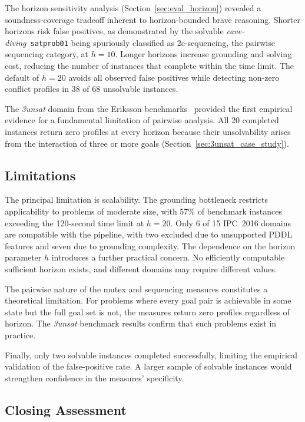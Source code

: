 The horizon sensitivity analysis (Section~\ref{sec:eval_horizon}) revealed a soundness-coverage \linebreak tradeoff inherent to horizon-bounded brave reasoning. Shorter horizons risk false positives, as demonstrated by the solvable \textit{cave-diving}~\texttt{satprob01} being spuriously classified as 2c-sequencing, the pairwise sequencing category, at $h = 10$. Longer horizons increase grounding and solving cost, reducing the number of instances that complete within the time limit. The default of $h = 20$ avoids all observed false positives while detecting non-zero conflict profiles in 38 of 68 unsolvable instances.

The \textit{3unsat} domain from the Eriksson benchmarks~\cite{Eriksson2019} provided the first empirical evidence for a fundamental limitation of pairwise analysis. All 20 completed instances return zero profiles at every horizon because their unsolvability arises from the interaction of three or more goals (Section~\ref{sec:3unsat_case_study}).

\subsection{Limitations}

The principal limitation is scalability. The grounding bottleneck restricts applicability to problems of moderate size, with 57\% of benchmark instances exceeding the 120-second time limit at $h = 20$. Only 6 of 15 \ac{IPC}~2016 domains are compatible with the pipeline, with two excluded due to unsupported \ac{PDDL} features and seven due to grounding complexity. The dependence on the horizon parameter $h$ introduces a further practical concern. No efficiently computable sufficient horizon exists, and different domains may require different values.

The pairwise nature of the mutex and sequencing measures constitutes a theoretical limitation. For problems where every goal pair is achievable in some state but the full goal set is not, the measures return zero profiles regardless of horizon. The \textit{3unsat} benchmark results confirm that such problems exist in practice.

Finally, only two solvable instances completed successfully, limiting the empirical validation of the false-positive rate. A larger sample of solvable instances would strengthen confidence in the measures' specificity.

\subsection{Closing Assessment}

